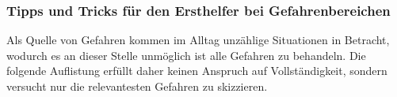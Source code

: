 % 

\subsubsection{Tipps und Tricks für den Ersthelfer bei
Gefahrenbereichen}

Als Quelle von Gefahren kommen im Alltag unzählige Situationen in
Betracht, wodurch es an dieser Stelle unmöglich ist alle Gefahren zu
behandeln. Die folgende Auflistung erfüllt daher keinen Anspruch auf
Vollständigkeit, sondern versucht nur die relevantesten Gefahren zu
skizzieren.

